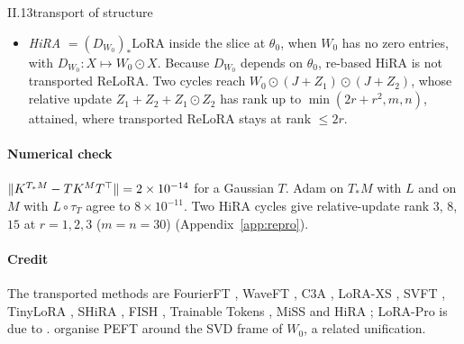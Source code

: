 \begin{proposition}{II.13}{transport of structure}
\begin{itemize}
\begin{itemize}
    \item LoRA-XS, SVFT, TinyLoRA: masks or random subspaces in the SVD frame of $W_0$, a $\theta_0$-dependent
      transport.
    \item SHiRA, FISH, Trainable Tokens: masks in the standard frame.
    \item MiSS/Bone in its default (balance) mode: $\Delta W=D(\mathbf 1_g\T\otimes I_r)$, which is LoRA-FA with a
      frozen \emph{summing} projection. Its BAT mode, $\Delta W=\operatorname{blocks}(W_0)\,M+M$ blockwise, is linear in
      the trained block $M$ but depends on $\theta_0$, so it is not additive.
    \item These frame readings of FourierFT and C3A are for \texttt{init\_weights=True}. HF's defaults start off
      $\theta_0$: FourierFT draws its spectrum from $\mathcal N(0,1)$ with scaling $150$ (at $768^2$ with $1000$
      frequencies, $\lVert\Delta W_0\rVert_F\approx4.3$, about $14\%$ of a std-$0.04$ $W_0$), and C3A is
      Xavier-uniform. These are objects with a pointing defect.
  \end{itemize}
  \item \emph{HiRA} $=(D_{W_0})_*\mathrm{LoRA}$ inside the slice at $\theta_0$, when $W_0$ has no zero entries, with
    $D_{W_0}:X\mapsto W_0\odot X$. Because $D_{W_0}$ depends on $\theta_0$, re-based HiRA is not transported ReLoRA. Two
    cycles reach $W_0\odot(J+Z_1)\odot(J+Z_2)$, whose relative update $Z_1+Z_2+Z_1\odot Z_2$ has rank up to
    $\min(2r+r^2,m,n)$, attained, where transported ReLoRA stays at rank $\le2r$.
\end{itemize}
\end{proposition}

\paragraph{Numerical check}
$\lVert K^{T_*M}-TK^MT^{\top}\rVert=2\times10^{-14}$ for a Gaussian $T$. Adam on $T_*M$ with $L$ and on $M$ with $L\circ\tau_T$
agree to $8\times10^{-11}$. Two HiRA cycles give relative-update rank $3$, $8$, $15$ at $r=1,2,3$ ($m=n=30$)
(Appendix~\ref{app:repro}).

\paragraph{Credit}
The transported methods are FourierFT \citep{gao2024parameter}, WaveFT \citep{bilican2025exploring}, C3A
\citep{chen2024parameter}, LoRA-XS \citep{baazy2024lora}, SVFT \citep{lingam2024svft}, TinyLoRA
\citep{morris2026learning}, SHiRA \citep{bhardwaj2024sparse}, FISH \citep{sung2021training}, Trainable Tokens
\citep{team2025trainable}, MiSS \citep{kang2024miss} and HiRA \citep{huang2025hira}; LoRA-Pro is due to
\citet{wang2024lorac}. \citet{si2024see} organise PEFT around the SVD frame of $W_0$, a related unification.

